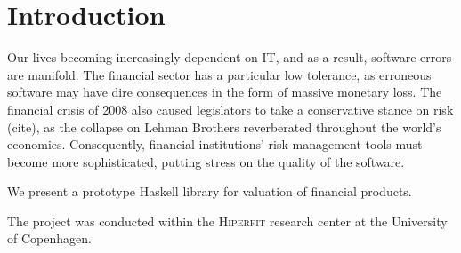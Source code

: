 \chapter{Introduction}

Our lives becoming increasingly dependent on IT, and as a result, software errors are manifold. The financial sector has a particular low tolerance, as erroneous software may have dire consequences in the form of massive monetary loss.
The financial crisis of 2008 also caused legislators to take a conservative
stance on risk (cite), as the collapse on Lehman Brothers reverberated throughout the world's economies.
Consequently, financial institutions' risk management tools must become more sophisticated, putting stress on the quality of the software.

We present a prototype Haskell library for valuation of financial products.

The project was conducted within the \textsc{Hiperfit} research center at the
University of Copenhagen.
